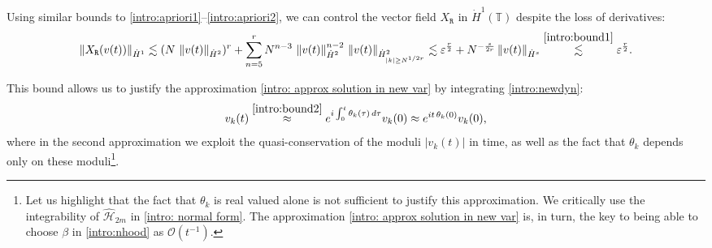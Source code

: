 \documentclass[a4paper,10pt,reqno]{article}
\theoremstyle{definition}
\theoremstyle{plain}
\theoremstyle{plain}
\theoremstyle{definition}
\theoremstyle{plain}
\theoremstyle{plain}
\theoremstyle{plain}
\theoremstyle{definition}
\theoremstyle{definition}
\newcommand{\norm}[1]{\left\lVert #1 \right\rVert}
\def \O{\mathcal{O}}
\def \T{\mathbb{T}}
\begin{document}
\smallskip

Using similar bounds to \eqref{intro:apriori1}--\eqref{intro:apriori2}, we can control the vector field $X_{\mathtt{R}}$ in $\dot{H}^1(\T)$ despite the loss of derivatives:
\begin{equation} \label{intro:bound2}
    \norm{X_{\mathtt{R}}(v(t))}_{\dot{H}^1} \lesssim  (N\,\norm{v(t)}_{\dot{H}^2})^r + \sum_{n=5}^r N^{n-3} \,\norm{v(t)}_{\dot{H}^2}^{n-2} \,\norm{v(t)}_{\dot{H}_{|k| \ge N^{1/2r}}^2} \lesssim 
    \varepsilon^{\frac{r}{2}} + N^{-\frac{s}{2r}} \norm{v(t)}_{\dot{H}^s}
    \stackrel{\eqref{intro:bound1}}{\lesssim} \varepsilon^{\frac{r}{2}}.
\end{equation}

This bound allows us to justify the approximation \eqref{intro: approx solution in new var} by integrating \eqref{intro:newdyn}:
\begin{equation}\label{intro:approx_proof}
    v_k(t) \stackrel{\eqref{intro:bound2}}{\approx} e^{i\int_0^t \theta_k (\tau)\, d\tau} v_k(0) \approx e^{i t\, \theta_k (0)} v_k(0),
\end{equation}
where in the second approximation we exploit the quasi-conservation of the moduli $|v_k(t)|$ in time, as well as the fact that $\theta_k$ depends only on these moduli\footnote{
Let us highlight that the fact that $\theta_k$ is real valued alone is not sufficient to justify this approximation. We critically use the integrability of $\widehat{\mathcal{H}}_{2m}$ in \eqref{intro: normal form}. The approximation \eqref{intro: approx solution in new var} is, in turn, the key to being able to choose $\beta$ in \eqref{intro:nhood} as $\O(t^{-1})$.
}.





\end{document}
